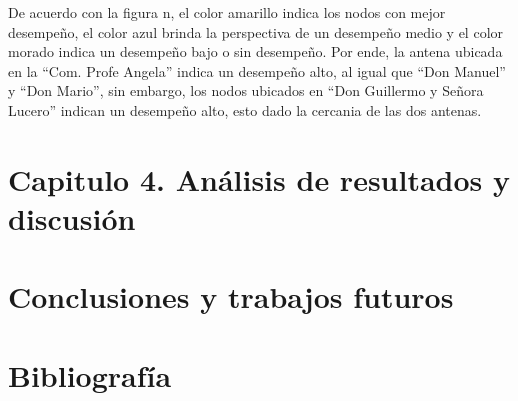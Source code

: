 \documentclass[]{article}
\begin{document}
De acuerdo con la figura n, el color amarillo indica los nodos con mejor
desempeño, el color azul brinda la perspectiva de un desempeño medio y
el color morado indica un desempeño bajo o sin desempeño. Por ende, la
antena ubicada en la ``Com. Profe Angela'' indica un desempeño alto, al
igual que ``Don Manuel'' y ``Don Mario'', sin embargo, los nodos
ubicados en ``Don Guillermo y Señora Lucero'' indican un desempeño alto,
esto dado la cercania de las dos antenas.

\section{Capitulo 4. Análisis de resultados y
discusión}\label{capitulo-4.-anuxe1lisis-de-resultados-y-discusiuxf3n}

\section{Conclusiones y trabajos
futuros}\label{conclusiones-y-trabajos-futuros}

\section{Bibliografía}\label{bibliografuxeda}
\end{document}
